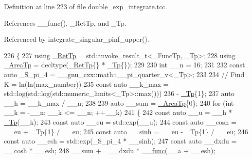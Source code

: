 Definition at line 223 of file double\+\_\+exp\+\_\+integrate.\+tcc.



References \+\_\+\+\_\+func(), \+\_\+\+Ret\+Tp, and \+\_\+\+Tp.



Referenced by integrate\+\_\+singular\+\_\+pinf\+\_\+upper().


\begin{DoxyCode}
226     \{
227       \textcolor{keyword}{using} \hyperlink{namespace____gnu__cxx_a886e03ece3d53ff7fa6c098a40f93fa5}{\_RetTp} = std::invoke\_result\_t<\_FuncTp, \_Tp>;
228       \textcolor{keyword}{using} \hyperlink{namespace____gnu__cxx_ae97a51b75e19c30f48d27fac4664de6e}{\_AreaTp} = decltype(\hyperlink{namespace____gnu__cxx_a886e03ece3d53ff7fa6c098a40f93fa5}{\_RetTp}\{\} * \hyperlink{namespace____gnu__cxx_a3b19a9c800ca194374ef9172290f7d79}{\_Tp}\{\});
229 
230       \textcolor{keywordtype}{int} \_\_n = 16;
231 
232       \textcolor{keyword}{const} \textcolor{keyword}{auto} \_S\_pi\_4 = \_\_gnu\_cxx::math::\_\_pi\_quarter\_v<\_Tp>;
233 
234       \textcolor{comment}{// Find K = ln(ln(max\_number))}
235       \textcolor{keyword}{const} \textcolor{keyword}{auto} \_\_k\_max = std::log(std::log(std::numeric\_limits<\_Tp>::max()))
236                 - \hyperlink{namespace____gnu__cxx_a3b19a9c800ca194374ef9172290f7d79}{\_Tp}\{1\};
237       \textcolor{keyword}{auto} \_\_h = \_\_k\_max / \_\_n;
238 
239       \textcolor{keyword}{auto} \_\_sum = \hyperlink{namespace____gnu__cxx_ae97a51b75e19c30f48d27fac4664de6e}{\_AreaTp}\{0\};
240       \textcolor{keywordflow}{for} (\textcolor{keywordtype}{int} \_\_k = -\_\_n; \_\_k <= \_\_n; ++\_\_k)
241         \{
242           \textcolor{keyword}{const} \textcolor{keyword}{auto} \_\_u = \_\_h * \hyperlink{namespace____gnu__cxx_a3b19a9c800ca194374ef9172290f7d79}{\_Tp}(\_\_k);
243           \textcolor{keyword}{const} \textcolor{keyword}{auto} \_\_eu = std::exp(\_\_u);
244           \textcolor{keyword}{const} \textcolor{keyword}{auto} \_\_cosh = \_\_eu + \hyperlink{namespace____gnu__cxx_a3b19a9c800ca194374ef9172290f7d79}{\_Tp}\{1\} / \_\_eu;
245           \textcolor{keyword}{const} \textcolor{keyword}{auto} \_\_sinh = \_\_eu - \hyperlink{namespace____gnu__cxx_a3b19a9c800ca194374ef9172290f7d79}{\_Tp}\{1\} / \_\_eu;
246           \textcolor{keyword}{const} \textcolor{keyword}{auto} \_\_esh = std::exp(\_S\_pi\_4 * \_\_sinh);
247           \textcolor{keyword}{const} \textcolor{keyword}{auto} \_\_dxdu = \_\_cosh * \_\_esh;
248           \_\_sum += \_\_dxdu * \hyperlink{namespace____gnu__cxx_af2b2f0c7a2ae72b922b1afefae5a65b2}{\_\_func}(\_\_a + \_\_esh);

\end{DoxyCode}
